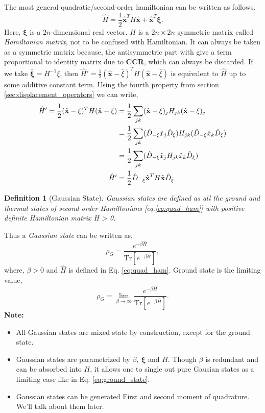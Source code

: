 \documentclass[english,10pt,a4paper]{article}
\newtheorem{definition}{Definition}
\newcommand{\xx}{\hat{\textbf{x}}}
\newcommand{\dd}[1]{\hat{D}_{#1}}
\newcommand{\ham}{\hat H}
\newcommand{\half}{\frac{1}{2}}
\newcommand{\tr}[1]{\text{Tr}\left[{#1}\right]}
\begin{document}
	The most general quadratic/second-order hamiltonian can be written as follows.
	\begin{equation}
		\label{eq:quad_ham}
		\ham = \half \xx^T H \xx + \xx^T \mathbf{\xi}.
	\end{equation}
	Here, $\mathbf{\xi}$ is a $2n$-dimensional real vector. $H$ is a $2n\times 2n$ symmetric matrix called \textit{Hamiltonian matrix}, not to be confused with Hamiltonian. It can always be taken as  a symmetric matrix because, the antisymmetric part with give a term proportional to identity matrix due to \textbf{CCR}, which can always be discarded. If we take $\bar{\mathbf{\xi}}=H^{-1}\xi$, then $\hat{H}' = \half (\xx-\bar{\xi})^T H (\xx-\bar{\xi})$ is equivalent to $\hat{H}$ up to some additive constant term. Using the fourth property from section \ref{sec:displacement_operators} we can write,
	\begin{align}
		\hat{H}' = \half (\xx-\bar{\xi})^T H (\xx-\bar{\xi}) &= \half \sum_{jk} (\xx-\xi) _j H_{jk} (\xx-\xi) _j \notag \\
		&= \half \sum_{jk} (\dd{-\xi} \hat x_j \dd{\xi})  H_{jk} (\dd{-\xi} \hat x_k \dd{\xi})  \notag\\
		&= \half \sum_{jk} (\dd{-\xi} \hat x_j H_{jk} \hat x_k \dd{\xi}) \notag\\
		\hat{H}'&= \half \dd{-\bar{\xi}} \xx^T H \xx \dd{\bar{\xi}}
	\end{align} 
	\begin{definition}[Gaussian State]
		Gaussian states are defined as all the ground and thermal states of second-order Hamiltonians [eq.\ref{eq:quad_ham}] with positive definite Hamiltonian matrix H > 0.
	\end{definition}
	Thus a \textit{Gaussian state} can be written as,
	\begin{equation}
		\label{eq:gaussian_state}
		\rho_G = \frac{e^{-\beta \hat{H}}}{\tr{e^{-\beta \hat{H}}}},
	\end{equation}
	where, $\beta >0$ and $\hat{H}$ is defined in Eq. \ref{eq:quad_ham}. Ground state is the limiting value,
	\begin{equation}
		\label{eq:ground_state}
		\rho_G = \lim_{\beta\to \infty} \frac{e^{-\beta \hat{H}}}{\tr{e^{-\beta \hat{H}}}}.
	\end{equation}
	\textbf{Note:}
	\begin{itemize}
		\item All Gaussian states are mixed state by construction, except for the ground state.
		\item Gaussian states are parametrized by $\beta,\ \mathbf{\xi}$ and $H$. Though $\beta$ is redundant and can be absorbed into $H$, it allows one to single out pure Gausian states as a limiting case like in Eq. \ref{eq:ground_state}. 
		\item Gaussian states can be generated First and second moment of quadrature. We'll talk about them later.
	\end{itemize}
	
\end{document}

